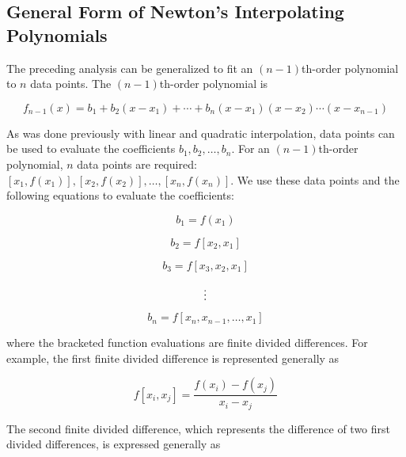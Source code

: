 \documentclass[../main.tex]{subfiles}
\begin{document}

\label{cha:cha_P_17_2_3} %
\subsection{General Form of Newton's Interpolating Polynomials}

\noindent The preceding analysis can be generalized to fit an $(n - 1)$th-order polynomial to $n$ data
points. The $(n - 1)$th-order polynomial is

\begin{equation}
	\tag{17.10}
	f_{n-1}(x) = b_1 + b_2 (x - x_1) + \cdots + b_n (x - x_1) (x - x_2) \cdots (x - x_{n-1})
\end{equation}

\noindent As was done previously with linear and quadratic interpolation, data points can be used to
evaluate the coefficients $b_1 , b_2 , \dots , b_n$. For an $(n - 1)$th-order polynomial, $n$ data points
are required: $[x_1 , f (x_1)], [x_2 , f (x_2)], \dots , [x_n , f (x_n )]$. We use these data points and the
following equations to evaluate the coefficients:

\begin{equation}
	\tag{17.11}
	b_1 = f(x_1)
\end{equation}

\begin{equation}
	\tag{17.12}
	b_2 = f[x_2,x_1]
\end{equation}

\begin{equation}
	\tag{17.13}
	b_3 = f[x_3, x_2, x_1]
\end{equation}

\begin{equation}
	\notag
	\vdots 
\end{equation}

\begin{equation}
	\tag{17.14}
	b_n = f[x_n, x_{n-1}, \dots, x_1]
\end{equation}

\noindent where the bracketed function evaluations are finite divided differences. For example, the
first finite divided difference is represented generally as

\begin{equation}
	\tag{17.15}
	f[x_i, x_j] = \frac{f(x_i) - f(x_j)}{x_i - x_j}
\end{equation}

\noindent The second finite divided difference, which represents the difference of two first divided
differences, is expressed generally as
\end{document}
